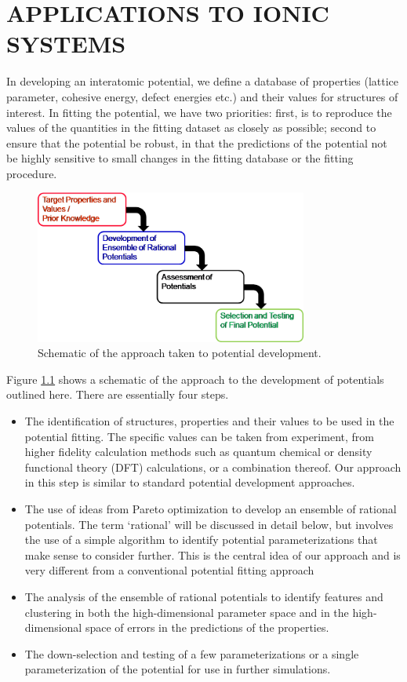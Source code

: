 \chapter{APPLICATIONS TO IONIC SYSTEMS}
\label{chapter:ionic_MgO}

In developing an interatomic potential, we define a database of properties (lattice parameter, cohesive energy, defect energies etc.) and their values for structures of interest. In fitting the potential, we have two priorities: first, is to reproduce the values of the quantities in the fitting dataset as closely as possible; second to ensure that the potential be robust, in that the predictions of the potential not be highly sensitive to small changes in the fitting database or the fitting procedure.

\begin{figure}[h]
	\centering
  \includegraphics[width=0.8\textwidth]{chapter7/pareto_schematic}
  \caption{Schematic of the approach taken to potential development.}
  \label{fig:pareto_schematic}
\end{figure}

Figure \ref{fig:pareto_schematic} shows a schematic of the approach to the development of potentials outlined here. There are essentially four steps.
\begin{itemize}
	\item The identification of structures, properties and their values to be used in the potential fitting. The specific values can be taken from experiment, from higher fidelity calculation methods such as quantum chemical or density functional theory (DFT) calculations, or a combination thereof. Our approach in this step is similar to standard potential development approaches.
 \item The use of ideas from Pareto optimization to develop an ensemble of rational potentials. The term ‘rational’ will be discussed in detail below, but involves the use of a simple algorithm to identify potential parameterizations that make sense to consider further. This is the central idea of our approach and is very different from a conventional potential fitting approach
 	\item The analysis of the ensemble of rational potentials to identify features and clustering in both the high-dimensional parameter space and in the high-dimensional space of errors in the predictions of the properties.
 	\item The down-selection and testing of a few parameterizations or a single parameterization of the potential for use in further simulations.
\end{itemize}

